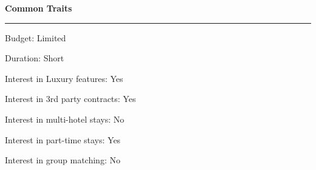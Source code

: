 \documentclass[12pt]{article}
\begin{document}
{\Huge\bfseries Common Traits} \\
\hrule
\Large
\begin{tcolorbox}[colback=red!10!white]
    Budget: Limited
\end{tcolorbox}
\begin{tcolorbox}[colback=red!10!white]
    Duration: Short
\end{tcolorbox}
\begin{tcolorbox}
    Interest in Luxury features: Yes
\end{tcolorbox}
\begin{tcolorbox}
    Interest in 3rd party contracts: Yes
\end{tcolorbox}
\begin{tcolorbox}[colback=red!10!white]
    Interest in multi-hotel stays: No
\end{tcolorbox}
\begin{tcolorbox}
    Interest in part-time stays: Yes
\end{tcolorbox}
\begin{tcolorbox}[colback=red!10!white]
    Interest in group matching: No
\end{tcolorbox}
\end{document}
